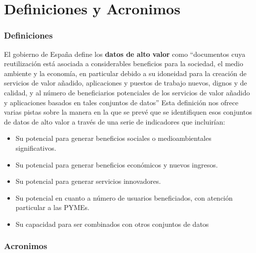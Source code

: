 \chapter{Definiciones y Acronimos}
\label{Appendix:1}

\subsection{Definiciones}

El gobierno de España define los \textbf{datos de alto valor} como “documentos cuya reutilización está asociada a considerables beneficios para la sociedad, el medio ambiente y la economía, en particular debido a su idoneidad para la creación de servicios de valor añadido, aplicaciones y puestos de trabajo nuevos, dignos y de calidad, y al número de beneficiarios potenciales de los servicios de valor añadido y aplicaciones basados en tales conjuntos de datos” Esta definición nos ofrece varias pistas sobre la manera en la que se prevé que se identifiquen esos conjuntos de datos de alto valor a través de una serie de indicadores que incluirían:
\begin{itemize}
	\item Su potencial para generar beneficios sociales o medioambientales significativos.
	
	\item Su potencial para generar beneficios económicos y nuevos ingresos.
	
	\item Su potencial para generar servicios innovadores.
	
	\item Su potencial en cuanto a número de usuarios beneficiados, con atención particular a las PYMEs.
	
	\item Su capacidad para ser combinados con otros conjuntos de datos
\end{itemize}

\subsection{Acronimos}


 \newpage
